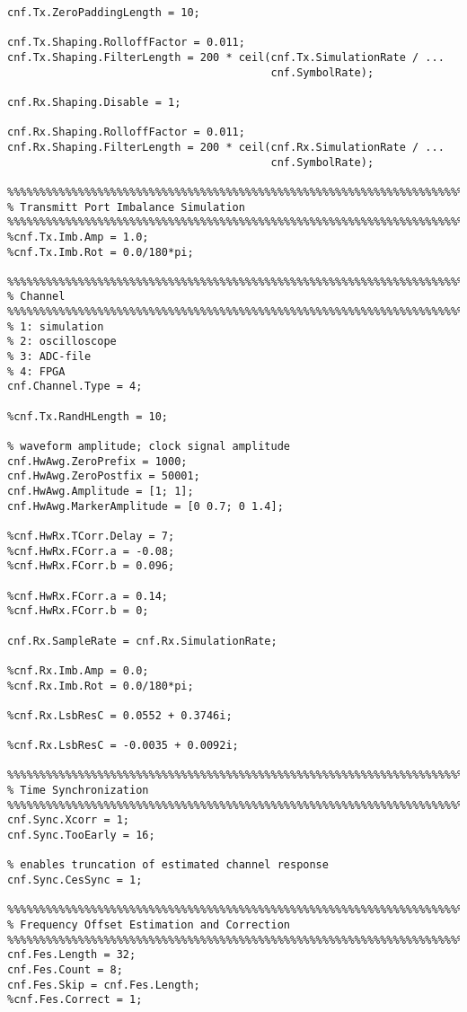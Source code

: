 \begin{appendix}
\begin{verbatim}
cnf.Tx.ZeroPaddingLength = 10;

cnf.Tx.Shaping.RolloffFactor = 0.011;
cnf.Tx.Shaping.FilterLength = 200 * ceil(cnf.Tx.SimulationRate / ...
                                         cnf.SymbolRate);

cnf.Rx.Shaping.Disable = 1;

cnf.Rx.Shaping.RolloffFactor = 0.011;
cnf.Rx.Shaping.FilterLength = 200 * ceil(cnf.Rx.SimulationRate / ...
                                         cnf.SymbolRate);

%%%%%%%%%%%%%%%%%%%%%%%%%%%%%%%%%%%%%%%%%%%%%%%%%%%%%%%%%%%%%%%%%%%%%%%%%%%%%%%%
% Transmitt Port Imbalance Simulation
%%%%%%%%%%%%%%%%%%%%%%%%%%%%%%%%%%%%%%%%%%%%%%%%%%%%%%%%%%%%%%%%%%%%%%%%%%%%%%%%
%cnf.Tx.Imb.Amp = 1.0;
%cnf.Tx.Imb.Rot = 0.0/180*pi;

%%%%%%%%%%%%%%%%%%%%%%%%%%%%%%%%%%%%%%%%%%%%%%%%%%%%%%%%%%%%%%%%%%%%%%%%%%%%%%%%
% Channel
%%%%%%%%%%%%%%%%%%%%%%%%%%%%%%%%%%%%%%%%%%%%%%%%%%%%%%%%%%%%%%%%%%%%%%%%%%%%%%%%
% 1: simulation
% 2: oscilloscope
% 3: ADC-file
% 4: FPGA
cnf.Channel.Type = 4;

%cnf.Tx.RandHLength = 10;

% waveform amplitude; clock signal amplitude
cnf.HwAwg.ZeroPrefix = 1000;
cnf.HwAwg.ZeroPostfix = 50001;
cnf.HwAwg.Amplitude = [1; 1];
cnf.HwAwg.MarkerAmplitude = [0 0.7; 0 1.4];

%cnf.HwRx.TCorr.Delay = 7;
%cnf.HwRx.FCorr.a = -0.08;
%cnf.HwRx.FCorr.b = 0.096;

%cnf.HwRx.FCorr.a = 0.14;
%cnf.HwRx.FCorr.b = 0;

cnf.Rx.SampleRate = cnf.Rx.SimulationRate;

%cnf.Rx.Imb.Amp = 0.0;
%cnf.Rx.Imb.Rot = 0.0/180*pi;

%cnf.Rx.LsbResC = 0.0552 + 0.3746i;

%cnf.Rx.LsbResC = -0.0035 + 0.0092i;

%%%%%%%%%%%%%%%%%%%%%%%%%%%%%%%%%%%%%%%%%%%%%%%%%%%%%%%%%%%%%%%%%%%%%%%%%%%%%%%%
% Time Synchronization
%%%%%%%%%%%%%%%%%%%%%%%%%%%%%%%%%%%%%%%%%%%%%%%%%%%%%%%%%%%%%%%%%%%%%%%%%%%%%%%%
cnf.Sync.Xcorr = 1;
cnf.Sync.TooEarly = 16;

% enables truncation of estimated channel response
cnf.Sync.CesSync = 1;

%%%%%%%%%%%%%%%%%%%%%%%%%%%%%%%%%%%%%%%%%%%%%%%%%%%%%%%%%%%%%%%%%%%%%%%%%%%%%%%%
% Frequency Offset Estimation and Correction
%%%%%%%%%%%%%%%%%%%%%%%%%%%%%%%%%%%%%%%%%%%%%%%%%%%%%%%%%%%%%%%%%%%%%%%%%%%%%%%%
cnf.Fes.Length = 32;
cnf.Fes.Count = 8;
cnf.Fes.Skip = cnf.Fes.Length;
%cnf.Fes.Correct = 1;


\end{verbatim}
\end{appendix}
